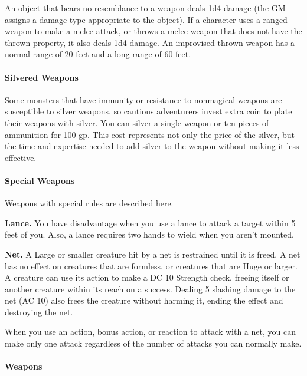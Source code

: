 \documentclass[
]{article}
\begin{document}
An object that bears no resemblance to a weapon deals 1d4 damage (the GM
assigns a damage type appropriate to the object). If a character uses a
ranged weapon to make a melee attack, or throws a melee weapon that does
not have the thrown property, it also deals 1d4 damage. An improvised
thrown weapon has a normal range of 20 feet and a long range of 60 feet.

\hypertarget{silvered-weapons}{%
\paragraph{Silvered Weapons}\label{silvered-weapons}}

Some monsters that have immunity or resistance to nonmagical weapons are
susceptible to silver weapons, so cautious adventurers invest extra coin
to plate their weapons with silver. You can silver a single weapon or
ten pieces of ammunition for 100 gp. This cost represents not only the
price of the silver, but the time and expertise needed to add silver to
the weapon without making it less effective.

\hypertarget{special-weapons}{%
\paragraph{Special Weapons}\label{special-weapons}}

Weapons with special rules are described here.

\textbf{Lance.} You have disadvantage when you use a lance to attack a
target within 5 feet of you. Also, a lance requires two hands to wield
when you aren't mounted.

\textbf{Net.} A Large or smaller creature hit by a net is restrained
until it is freed. A net has no effect on creatures that are formless,
or creatures that are Huge or larger. A creature can use its action to
make a DC 10 Strength check, freeing itself or another creature within
its reach on a success. Dealing 5 slashing damage to the net (AC 10)
also frees the creature without harming it, ending the effect and
destroying the net.

When you use an action, bonus action, or reaction to attack with a net,
you can make only one attack regardless of the number of attacks you can
normally make.

\hypertarget{weapons-1}{%
\paragraph{Weapons}\label{weapons-1}}
\end{document}
